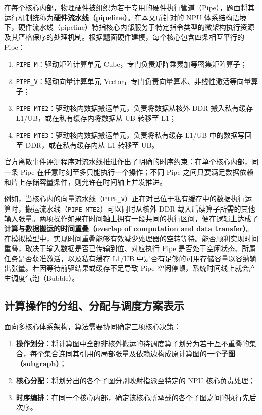\documentclass[anonymous,notoc]{gmcm2026}
\providecommand{\tightlist}{\setlength{\itemsep}{0pt}\setlength{\parskip}{0pt}}
\begin{document}
在每个核心内部，物理硬件被组织为若干专用的硬件执行管道（Pipe），题面将其运行机制统称为\textbf{硬件流水线（pipeline）}。在本文所针对的 NPU 体系结构语境下，硬件流水线（pipeline）特指核心内部服务于特定指令类型的微架构执行资源及其严格保序的处理机制。根据题面硬件建模，每个核心包含四条相互平行的 Pipe：

\begin{enumerate}
\def\labelenumi{\arabic{enumi}.}
\tightlist
\item
  \texttt{PIPE\_M}：驱动矩阵计算单元 Cube，专门负责矩阵乘累加等密集矩阵算子；
\item
  \texttt{PIPE\_V}：驱动向量计算单元 Vector，专门负责向量算术、非线性激活等向量算子；
\item
  \texttt{PIPE\_MTE2}：驱动核内数据搬运单元，负责将数据从核外 DDR 搬入私有缓存 L1/UB，或在私有缓存内将数据从 UB 转移至 L1；
\item
  \texttt{PIPE\_MTE3}：驱动核内数据搬运单元，负责将私有缓存 L1/UB 中的数据写回至 DDR，或在私有缓存内从 L1 转移至 UB。
\end{enumerate}

官方离散事件评测程序对流水线推进作出了明确的时序约束：在单个核心内部，同一条 Pipe 在任意时刻至多只能执行一个操作；不同 Pipe 之间只要满足数据依赖和片上存储容量条件，则允许在时间轴上并发推进。

例如，当核心内的向量流水线（\texttt{PIPE\_V}）正在对已位于私有缓存中的数据执行运算时，搬运流水线（\texttt{PIPE\_MTE2}）可以同时从核外 DDR 载入后续算子所需的其他输入张量。两项操作如果在时间轴上拥有一段共同的执行区间，便在逻辑上达成了\textbf{计算与数据搬运的时间重叠（overlap of computation and data transfer）}。在模拟模型中，实现时间重叠能够有效减少处理器的空转等待。能否顺利实现时间重叠，取决于输入数据是否已传输到位、对应执行 Pipe 是否处于空闲状态、所属任务是否获准激活，以及私有缓存 L1/UB 中是否有足够的可用存储容量以容纳输出张量。若因等待前驱结果或缓存不足导致 Pipe 空闲停顿，系统时间线上就会产生调度气泡（Bubble）。

\subsection{计算操作的分组、分配与调度方案表示}

面向多核心体系架构，算法需要协同确定三项核心决策：

\begin{enumerate}
\def\labelenumi{\arabic{enumi}.}
\tightlist
\item
  \textbf{操作划分}：将计算图中全部非核外搬运的待调度算子划分为若干互不重叠的集合，每个集合连同其引用的局部张量及依赖边构成原计算图的一个\textbf{子图（subgraph）}；
\item
  \textbf{核心分配}：将划分出的各个子图分别映射指派至特定的 NPU 核心负责处理；
\item
  \textbf{时序编排}：在同一个核心内部，确定该核心所承载的各个子图之间的执行先后次序。
\end{enumerate}
\end{document}
